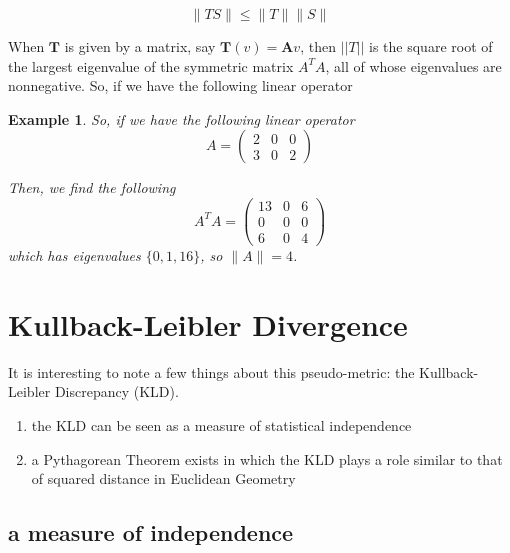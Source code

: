\documentclass[10pt]{article}
\newtheorem{example}[ex]{Example}
\begin{document}
\begin{dmath}
\|TS\| \leq \|T\| \|S\|
\end{dmath}

When $\textbf{T}$ is given by a matrix, say $\mathbf{T}(v)=\mathbf{A}v$, then $||T||$ is the square root of the largest eigenvalue of the symmetric matrix $A^TA$, all of whose eigenvalues are nonnegative.  So, if we have the following linear operator

\begin{example}
So, if we have the following linear operator
\begin{dmath}
A = \left(
	\begin{array}{ccc}
	2&0 & 0 \\
	3 & 0 & 2
	\end{array} \right) 
\end{dmath}

Then, we find the following 
\begin{dmath}
A^T A = \left(
	\begin{array}{ccc}
	13 & 0 & 6 \\
	0 & 0 & 0 \\
	6 & 0 & 4
	\end{array} \right)
\end{dmath}
which has eigenvalues $\{0,1,16\}$, so $\|A\| = 4$.
\end{example}












\section{Kullback-Leibler Divergence}

It is interesting to note a few things about this pseudo-metric: the Kullback-Leibler Discrepancy (KLD).

\begin{enumerate}
	\item the KLD can be seen as a measure of statistical independence
	\item a Pythagorean Theorem exists in which the KLD plays a role similar to that of squared distance in Euclidean Geometry
\end{enumerate}

\subsection{a measure of independence}
\end{document}

